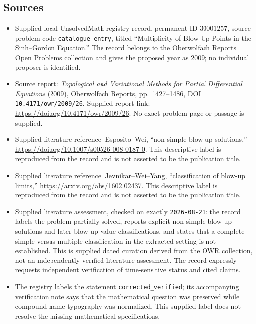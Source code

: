 \documentclass[11pt]{article}
\begin{document}
\subsection{Sources}
\begin{itemize}
\item Supplied local UnsolvedMath registry record, permanent ID \(30001257\), source problem code \texttt{catalogue entry}, titled ``Multiplicity of Blow-Up Points in the Sinh--Gordon Equation.'' The record belongs to the Oberwolfach Reports Open Problems collection and gives the proposed year as 2009; no individual proposer is identified.
\item Source report: \emph{Topological and Variational Methods for Partial Differential Equations} (2009), Oberwolfach Reports, pp.\ 1427--1486, DOI \texttt{10.4171/owr/2009/26}. Supplied report link: \url{https://doi.org/10.4171/owr/2009/26}. No exact problem page or passage is supplied.
\item Supplied literature reference: Esposito--Wei, ``non-simple blow-up solutions,'' \url{https://doi.org/10.1007/s00526-008-0187-0}. This descriptive label is reproduced from the record and is not asserted to be the publication title.
\item Supplied literature reference: Jevnikar--Wei--Yang, ``classification of blow-up limits,'' \url{https://arxiv.org/abs/1602.02437}. This descriptive label is reproduced from the record and is not asserted to be the publication title.
\item Supplied literature assessment, checked on exactly \texttt{2026-08-21}: the record labels the problem partially solved, reports explicit non-simple blow-up solutions and later blow-up-value classifications, and states that a complete simple-versus-multiple classification in the extracted setting is not established. This is supplied dated curation derived from the OWR collection, not an independently verified literature assessment. The record expressly requests independent verification of time-sensitive status and cited claims.
\item The registry labels the statement \texttt{corrected\_verified}; its accompanying verification note says that the mathematical question was preserved while compound-name typography was normalized. This supplied label does not resolve the missing mathematical specifications.
\end{itemize}
\end{document}
